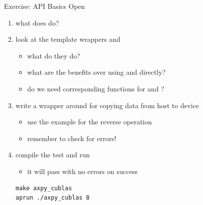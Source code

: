\begin{frame}[fragile]{Exercise: API Basics}
    Open 
    \begin{enumerate}
        \item what does  do?

        \item look at the template wrappers  and 
        \begin{itemize}
            \item what do they do?
            \item what are the benefits over using  and  directly?
            \item do we need corresponding functions for  and ?
        \end{itemize}

        \item write a wrapper around  for copying data from host to device
        \begin{itemize}
            \item use the example for the reverse operation 
            \item remember to check for errors!
        \end{itemize}

        \item compile the test and run
        \begin{itemize}
            \item it will pass with no errors on success
        \end{itemize}

    \vspace{-5pt}
\begin{lstlisting}[style=terminal]
make axpy_cublas
aprun ./axpy_cublas 8
\end{lstlisting}
    \end{enumerate}

\end{frame}

